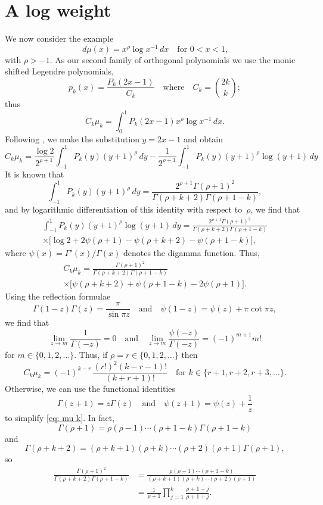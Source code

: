 \documentclass[12pt,a4paper]{article}
\begin{document}
\section{A log weight}
We now consider the example
\[
d\mu(x)=x^\rho\log x^{-1}\,dx\quad\text{for $0<x<1$,}
\]
with $\rho>-1$.  As our second family of orthogonal polynomials we 
use the monic shifted Legendre polynomials,
\[
p_k(x)=\frac{P_k(2x-1)}{C_k}
\quad\text{where}\quad
C_k=\binom{2k}{k};
\]
thus
\[
C_k\mu_k=\int_0^1 P_k(2x-1)x^\rho\log x^{-1}\,dx.
\]
Following \cite{Gautschi1979}, we make the substitution $y=2x-1$
and obtain
\[
C_k\mu_k=\frac{\log 2}{2^{\rho+1}}\int_{-1}^1 P_k(y)(y+1)^\rho\,dy
	-\frac{1}{2^{\rho+1}}\int_{-1}^1 
		P_k(y)(y+1)^\rho\log(y+1)\,dy
\]
It is known that
\[
\int_{-1}^1 P_k(y)(y+1)^\rho\,dy
	=\frac{2^{\rho+1}\Gamma(\rho+1)^2}%
{\Gamma(\rho+k+2)\Gamma(\rho+1-k)},
\]
and by logarithmic differentiation of this identity with respect 
to~$\rho$, we find that
\begin{multline*}
\int_{-1}^1 P_k(y)(y+1)^\rho\log(y+1)\,dy
	=\frac{2^{\rho+1}\Gamma(\rho+1)^2}%
{\Gamma(\rho+k+2)\Gamma(\rho+1-k)}\\
	\times\bigl[\log2+2\psi(\rho+1)-\psi(\rho+k+2)-\psi(\rho+1-k)
	\bigr],
\end{multline*}
where $\psi(x)=\Gamma'(x)/\Gamma(x)$ denotes the digamma function.
Thus,
\begin{multline}\label{eq: mu k}
C_k\mu_k=\frac{\Gamma(\rho+1)^2}{\Gamma(\rho+k+2)\Gamma(\rho+1-k)}\\
	\times\bigl[\psi(\rho+k+2)+\psi(\rho+1-k)-2\psi(\rho+1)\bigr].
\end{multline}
Using the reflection formulae
\[
\Gamma(1-z)\Gamma(z)=\frac{\pi}{\sin\pi z}
\quad\text{and}\quad
\psi(1-z)=\psi(z)+\pi\cot\pi z,
\]
we find that
\[
\lim_{z\to m}\frac{1}{\Gamma(-z)}=0
\quad\text{and}\quad
\lim_{z\to m}\frac{\psi(-z)}{\Gamma(-z)}=(-1)^{m+1}m!
\]
for $m\in\{0,1,2,\dots\}$.  Thus, if $\rho=r\in\{0,1,2,\dots\}$
then
\[
C_k\mu_k=(-1)^{k-r}\,\frac{(r!)^2(k-r-1)!}{(k+r+1)!}
	\quad\text{for $k\in\{r+1, r+2, r+3, \dots\}$.}
\]
Otherwise, we can use the functional identities
\[
\Gamma(z+1)=z\Gamma(z)\quad\text{and}\quad
\psi(z+1)=\psi(z)+\frac{1}{z}
\]
to simplify \eqref{eq: mu k}.  In fact,
\[
\Gamma(\rho+1)=\rho(\rho-1)\cdots(\rho+1-k)\Gamma(\rho+1-k)
\]
and
\[
\Gamma(\rho+k+2)=(\rho+k+1)(\rho+k)\cdots(\rho+2)(\rho+1)
	\Gamma(\rho+1),
\]
so
\begin{align*}
\frac{\Gamma(\rho+1)^2}{\Gamma(\rho+k+2)\Gamma(\rho+1-k)}
	&=\frac{\rho(\rho-1)\cdots(\rho+1-k)}%
{(\rho+k+1)(\rho+k)\cdots(\rho+2)(\rho+1)}\\
	&=\frac{1}{\rho+1}\prod_{j=1}^k\frac{\rho+1-j}{\rho+1+j}.
\end{align*}
\end{document}

